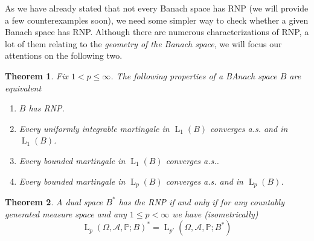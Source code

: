 \documentclass[]{report}
\newcommand{\lp}[2]{\operatorname{L}_{#1}({#2})}
\newcommand{\pspc}{\Omega,\mathcal{A},\mathbb{P}}
\newtheorem{theorem}{Theorem}[chapter]
\begin{document}
As we have already stated that not every Banach space has RNP (we will provide a few counterexamples soon), we need some simpler way to check whether a given Banach space has RNP. Although there are numerous characterizations of RNP, a lot of them relating to the \textit{geometry of the Banach space}, we will focus our attentions on the following two.

\begin{theorem}\label{RNP1}
	Fix $1<p \leq \infty$. The following properties of a BAnach space $B$ are equivalent
	\begin{enumerate}
		\item $B$ has RNP.
		\item  Every uniformly integrable martingale in $\operatorname{L}_1(B)$ converges a.s. and in $\lp{1}{B}$.
		\item Every bounded martingale in $\operatorname{L}_1(B)$ converges a.s..
		\item Every bounded martingale in $\operatorname{L}_p(B)$ converges a.s. and in $\lp{p}{B}$.
	\end{enumerate}
\end{theorem}
\begin{theorem}\label{RNP2}
	A dual space $B^*$ has the RNP if and only if for any countably generated measure space and any $1\leq p < \infty$ we have (isometrically)
	\[ \lp{p}{\pspc;B}^*= \lp{p'}{\pspc;B^*} \]	
\end{theorem}
\end{document}
